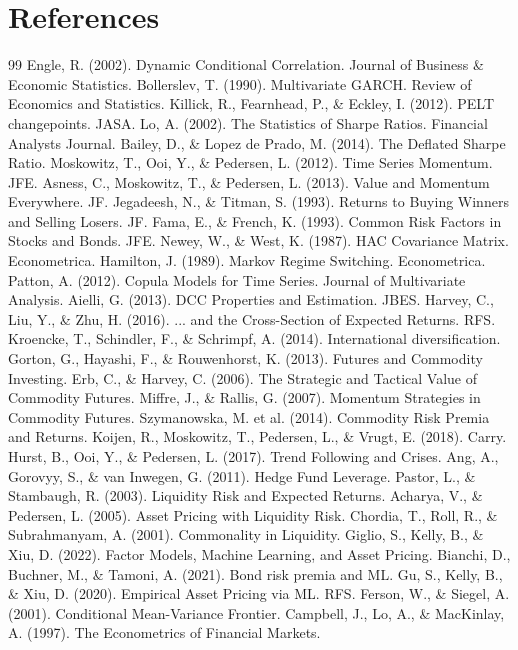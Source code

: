 \documentclass[11pt]{article}
\begin{document}
\section{References}
\begin{thebibliography}{99}
 Engle, R. (2002). Dynamic Conditional Correlation. Journal of Business \& Economic Statistics.
 Bollerslev, T. (1990). Multivariate GARCH. Review of Economics and Statistics.
 Killick, R., Fearnhead, P., \& Eckley, I. (2012). PELT changepoints. JASA.
 Lo, A. (2002). The Statistics of Sharpe Ratios. Financial Analysts Journal.
 Bailey, D., \& Lopez de Prado, M. (2014). The Deflated Sharpe Ratio.
 Moskowitz, T., Ooi, Y., \& Pedersen, L. (2012). Time Series Momentum. JFE.
 Asness, C., Moskowitz, T., \& Pedersen, L. (2013). Value and Momentum Everywhere. JF.
 Jegadeesh, N., \& Titman, S. (1993). Returns to Buying Winners and Selling Losers. JF.
 Fama, E., \& French, K. (1993). Common Risk Factors in Stocks and Bonds. JFE.
 Newey, W., \& West, K. (1987). HAC Covariance Matrix. Econometrica.
 Hamilton, J. (1989). Markov Regime Switching. Econometrica.
 Patton, A. (2012). Copula Models for Time Series. Journal of Multivariate Analysis.
 Aielli, G. (2013). DCC Properties and Estimation. JBES.
 Harvey, C., Liu, Y., \& Zhu, H. (2016). ... and the Cross-Section of Expected Returns. RFS.
 Kroencke, T., Schindler, F., \& Schrimpf, A. (2014). International diversification.
 Gorton, G., Hayashi, F., \& Rouwenhorst, K. (2013). Futures and Commodity Investing.
 Erb, C., \& Harvey, C. (2006). The Strategic and Tactical Value of Commodity Futures.
 Miffre, J., \& Rallis, G. (2007). Momentum Strategies in Commodity Futures.
 Szymanowska, M. et al. (2014). Commodity Risk Premia and Returns.
 Koijen, R., Moskowitz, T., Pedersen, L., \& Vrugt, E. (2018). Carry.
 Hurst, B., Ooi, Y., \& Pedersen, L. (2017). Trend Following and Crises.
 Ang, A., Gorovyy, S., \& van Inwegen, G. (2011). Hedge Fund Leverage.
 Pastor, L., \& Stambaugh, R. (2003). Liquidity Risk and Expected Returns.
 Acharya, V., \& Pedersen, L. (2005). Asset Pricing with Liquidity Risk.
 Chordia, T., Roll, R., \& Subrahmanyam, A. (2001). Commonality in Liquidity.
 Giglio, S., Kelly, B., \& Xiu, D. (2022). Factor Models, Machine Learning, and Asset Pricing.
 Bianchi, D., Buchner, M., \& Tamoni, A. (2021). Bond risk premia and ML.
 Gu, S., Kelly, B., \& Xiu, D. (2020). Empirical Asset Pricing via ML. RFS.
 Ferson, W., \& Siegel, A. (2001). Conditional Mean-Variance Frontier.
 Campbell, J., Lo, A., \& MacKinlay, A. (1997). The Econometrics of Financial Markets.
\end{thebibliography}
\end{document}
